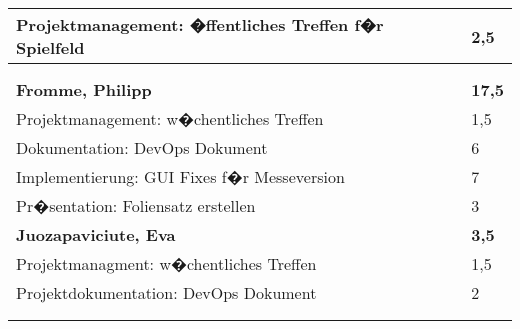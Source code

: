 \documentclass[a4paper,11pt]{scrartcl}
\begin{document}
\begin{longtable}{| p{13.8cm} | C{2.4cm} |}
  Projektmanagement: �ffentliches Treffen f�r Spielfeld
	&
  2,5
	\\
	\hline


	&

	\\
	\hline


	&

	\\
	\hline
	\hline


	\textbf{Fromme, Philipp} & \textbf{17,5}\\ %
	\hline

	Projektmanagement: w�chentliches Treffen
	&
	1,5
	\\
	\hline

	Dokumentation: DevOps Dokument
	&
	6
	\\
	\hline

  Implementierung: GUI Fixes f�r Messeversion
	&
  7
	\\
	\hline

  Pr�sentation: Foliensatz erstellen
	&
  3
	\\
	\hline
	\hline


	\textbf{Juozapaviciute, Eva} & \textbf{3,5}\\ %
	\hline

  Projektmanagment: w�chentliches Treffen
	&
  1,5
	\\
	\hline

  Projektdokumentation: DevOps Dokument
	&
  2
	\\
	\hline


	&

	\\
	\hline


	&

	\\
	\hline
	\hline



\end{longtable}
\end{document}
